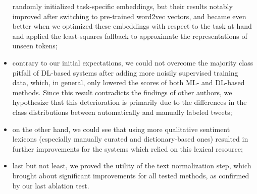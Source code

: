\begin{itemize}
    randomly initialized task-specific embeddings, but their results
    notably improved after switching to pre-trained word2vec vectors,
    and became even better when we optimized these embeddings with
    respect to the task at hand and applied the least-squares fallback
    to approximate the representations of unseen tokens;
  \item contrary to our initial expectations, we could not overcome
    the majority class pitfall of DL-based systems after adding more
    noisily supervised training data, which, in general, only lowered
    the scores of both ML- and DL-based methods.  Since this result
    contradicts the findings of other authors, we hypothesize that
    this deterioration is primarily due to the differences in the
    class distributions between automatically and manually labeled
    tweets;
  \item on the other hand, we could see that using more qualitative
    sentiment lexicons (especially manually curated and
    dictionary-based ones) resulted in further improvements for the
    systems which relied on this lexical resource;
  \item last but not least, we proved the utility of the text
    normalization step, which brought about significant improvements
    for all tested methods, as confirmed by our last ablation test.
\end{itemize}
